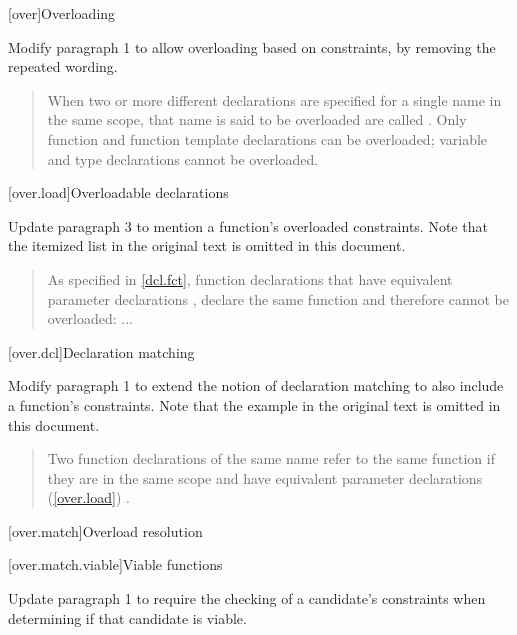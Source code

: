 
\setcounter{chapter}{15}
[over]{Overloading}

Modify paragraph 1 to allow overloading based on constraints, by
removing the repeated wording.

\begin{quote}
\pnum
When two or more different declarations are specified for a single name 
in the same scope, that name is said to be overloaded
are called . Only function and function 
template declarations can be overloaded; variable and type declarations 
cannot be overloaded.
\end{quote}

[over.load]{Overloadable declarations}

Update paragraph 3 to mention a function's overloaded constraints. 
Note that the itemized list in the original text is omitted in this
document.

\begin{quote}
\setcounter{Paras}{2}
\pnum
\enternote
As specified in \ref{dcl.fct}, function declarations that have equivalent 
parameter declarations , declare the same function and therefore cannot be 
overloaded: ...
\exitnote
\end{quote}


[over.dcl]{Declaration matching}

Modify paragraph 1 to extend the notion of declaration matching to
also include a function's constraints. Note that the example in the original
text is omitted in this document.

\begin{quote}
Two function declarations of the same name refer to the same function if 
they are in the same scope and have equivalent parameter declarations 
(\ref{over.load}) .
\end{quote}


[over.match]{Overload resolution}


\setcounter{subsection}{1}
[over.match.viable]{Viable functions}

Update paragraph 1 to require the checking of a candidate's
constraints when determining if that candidate is viable.

